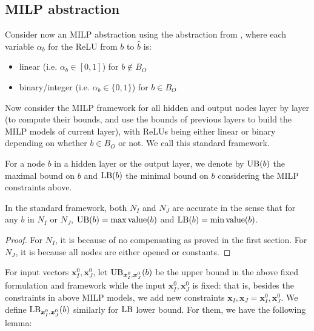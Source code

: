 				
				\subsection{MILP abstraction}
				
				Consider now an MILP abstraction using the abstraction from \cite{MILP}, 
				where each variable $\alpha_b$ for the ReLU from $b$ to $\hat{b}$ is:
				\begin{itemize}
					\item linear  (i.e. $\alpha_b \in [0,1]$) for $b \notin B_{O}$
					\item binary/integer (i.e. $\alpha_b \in \{0,1\}$) for $b \in B_{O}$
				\end{itemize}
				
				Now consider the MILP framework for all hidden and output nodes layer by layer (to compute their bounds, and use the bounds of previous layers to build the MILP models of current layer), with ReLUs being either linear or binary depending on whether $b \in B_{O}$ or not. We call this standard framework.
				
				For a node $b$ in a hidden layer or the output layer, we denote by $\mathrm{UB}(b)$ the maximal bound on $b$ and $\mathrm{LB}(b)$ the minimal bound on $b$ considering the MILP constraints above.
				
				
				\begin{lemma}
					In the standard framework, both $N_I$ and $N_J$ are accurate in the sense that for any $b$ in $N_I$ or $N_J$, $\mathrm{UB}(b)=\max{\textrm{value}}(b)$ and $\mathrm{LB}(b)=\min{\textrm{value}}(b)$.
				\end{lemma}
				
				\begin{proof}
					For $N_I$, it is because of no compensating as proved in the first section. For $N_J$, it is because all nodes are either opened or constants.
				\end{proof}
				
				
				
				
				For input vectors $\boldsymbol{x}^0_I,\boldsymbol{x}^0_J$, let $\mathrm{UB}_{\boldsymbol{x}^0_I,\boldsymbol{x}^0_J}(b)$ be the upper bound in the above fixed formulation and framework while the input $\boldsymbol{x}^0_I,\boldsymbol{x}^0_J$ is fixed: that is, besides the constraints in above MILP models, we add new constraints $\boldsymbol{x}_I,\boldsymbol{x}_J=\boldsymbol{x}^0_I,\boldsymbol{x}^0_J$. We  define $\mathrm{LB}_{\boldsymbol{x}^0_I,\boldsymbol{x}^0_J}(b)$ similarly for $\mathrm{LB}$ lower bound. For them, we have the following lemma:
				
